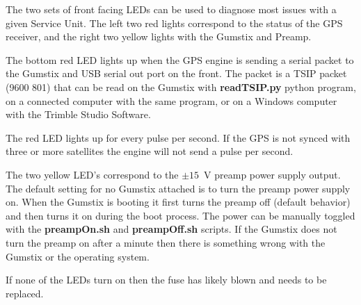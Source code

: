 The two sets of front facing LEDs can be used to diagnose most issues with a given Service Unit.
The left two red lights correspond to the status of the GPS receiver, and the right two yellow lights with the Gumstix and Preamp.

The bottom red LED lights up when the GPS engine is sending a serial packet to the Gumstix and USB serial out port on the front.
The packet is a TSIP packet (9600 801) that can be read on the Gumstix with {\bf readTSIP.py} python program, on a connected computer with the same program, or on a Windows computer with the Trimble Studio Software.

The red LED lights up for every pulse per second.
If the GPS is not synced with three or more satellites the engine will not send a pulse per second.

The two yellow LED's correspond to the $\pm15$~V preamp power supply output.
The default setting for no Gumstix attached is to turn the preamp power supply on.
When the Gumstix is booting it first turns the preamp off (default behavior) and then turns it on during the boot process.
The power can be manually toggled with the {\bf preampOn.sh} and {\bf preampOff.sh} scripts.
If the Gumstix does not turn the preamp on after a minute then there is something wrong with the Gumstix or the operating system.

If none of the LEDs turn on then the fuse has likely blown and needs to be replaced.

